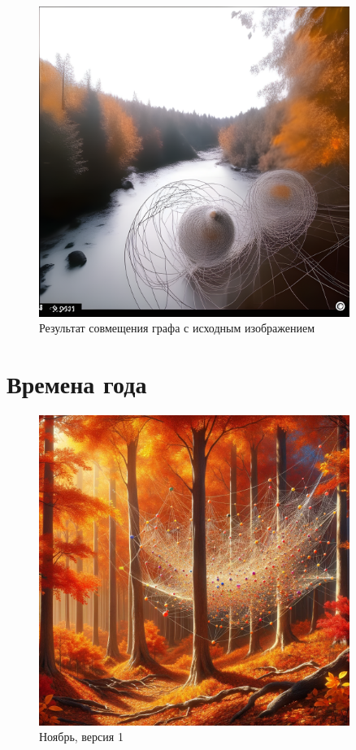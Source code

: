 \documentclass[a4paper,oneside,14pt]{extarticle}
\begin{document}
\begin{figure}[H]
	\centering
    \includegraphics[width=0.9\textwidth]{img/combine.png}
	\caption{Результат совмещения графа с исходным изображением}
	\label{fig:}
\end{figure}

\section{Времена года}

\begin{figure}[H]
	\centering
    \includegraphics[width=0.9\textwidth]{img/dalle1.png}
	\caption{Ноябрь, версия 1}
	\label{fig:}
\end{figure}
\end{document}
